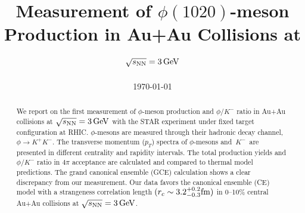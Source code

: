 \documentclass[%
 reprint,	
showpacs,
 amsmath,amssymb,
 aps,
 prc,
]{revtex4-1}
\begin{document}

\title{Measurement of $\phi(1020)$-meson Production in Au+Au Collisions at ${\sqrt{s_{\rm NN}} = \rm{3\,GeV}}$}%


\noaffiliation

\date{\today}%

\begin{abstract}


We report on the first measurement of $\phi$-meson production and $\phi/K^-$ ratio in Au+Au collisions at ${\sqrt{s_{\rm NN}} = \rm{3\,GeV}}$ with the STAR experiment under fixed target configuration at RHIC. $\phi$-mesons are measured through their hadronic decay channel, $\phi\rightarrow K^+K^-$. The transverse momentum ($p_T$) spectra of $\phi$-mesons and $K^-$ are presented in different centrality and rapidity intervals. The total production yields and $\phi/K^-$ ratio in $4\pi$ acceptance are calculated and compared to thermal model predictions. The grand canonical ensemble (GCE) calculation shows a clear discrepancy from our measurement. Our data favors the canonical ensemble (CE) model with a strangeness correlation length $(r_c   \sim 3.2_{-0.3}^{+0.2} \rm{fm})$ in 0--10\% central Au+Au collisions at ${\sqrt{s_{\rm NN}} = \rm{3\,GeV}}$.


\end{abstract}
\end{document}
